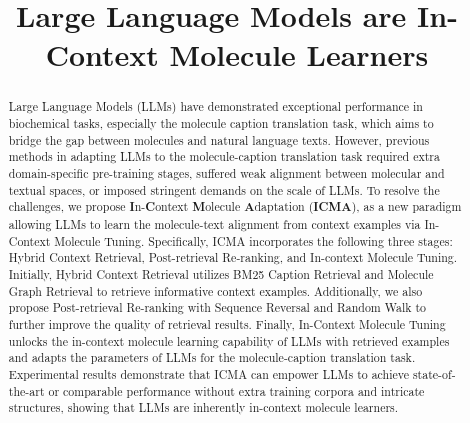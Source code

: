 \title{Large Language Models are In-Context Molecule Learners}



\maketitle

\begin{abstract}
Large Language Models (LLMs) have demonstrated exceptional performance in biochemical tasks, especially the molecule caption translation task, which aims to bridge the gap between molecules and natural language texts.
However, previous methods in adapting LLMs to the molecule-caption translation task required extra domain-specific pre-training stages, suffered weak alignment between molecular and textual spaces, or imposed stringent demands on the scale of LLMs.
To resolve the challenges, we propose \textbf{I}n-\textbf{C}ontext \textbf{M}olecule \textbf{A}daptation (\textbf{ICMA}), as a new paradigm allowing LLMs to learn the molecule-text alignment from context examples via In-Context Molecule Tuning. 
Specifically, ICMA incorporates the following three stages: Hybrid Context Retrieval, Post-retrieval Re-ranking, and In-context Molecule Tuning.
Initially, Hybrid Context Retrieval utilizes BM25 Caption Retrieval and Molecule Graph Retrieval to retrieve informative context examples. 
Additionally, we also propose Post-retrieval Re-ranking with Sequence Reversal and Random Walk to further improve the quality of retrieval results. 
Finally, In-Context Molecule Tuning unlocks the in-context molecule learning capability of LLMs with retrieved examples and adapts the parameters of LLMs for the molecule-caption translation task.
Experimental results demonstrate that ICMA can empower LLMs to achieve state-of-the-art or comparable performance without extra training corpora and intricate structures, showing that LLMs are inherently in-context molecule learners.
\end{abstract}
 

